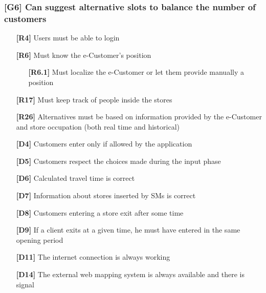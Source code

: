 \subsubsection{[G6] Can suggest alternative slots to balance the number of customers}
\begin{itemize}
	\setlength\itemsep{-1mm}
	\item [\textbf{[R4]}] Users must be able to login
	\item [\textbf{[R6]}] Must know the e-Customer’s position
	\begin{itemize}[itemsep=-1mm, topsep=-1mm]
		\item [\textbf{[R6.1]}] Must localize the e-Customer or let them provide manually a position
	\end{itemize}
	\item [\textbf{[R17]}] Must keep track of people inside the stores
	\item [\textbf{[R26]}] Alternatives must be based on information provided by the e-Customer and store occupation (both real time and historical)
	\\
	\item [\textbf{[D4]}] Customers enter only if allowed by the application
	\item [\textbf{[D5]}] Customers respect the choices made during the input phase
	\item [\textbf{[D6]}] Calculated travel time is correct
	\item [\textbf{[D7]}] Information about stores inserted by SMs is correct
	\item [\textbf{[D8]}] Customers entering a store exit after some time
	\item [\textbf{[D9]}] If a client exits at a given time, he must have entered in the same opening period
	\item [\textbf{[D11]}] The internet connection is always working
	\item [\textbf{[D14]}] The external web mapping system is always available and there is signal
\end{itemize}


